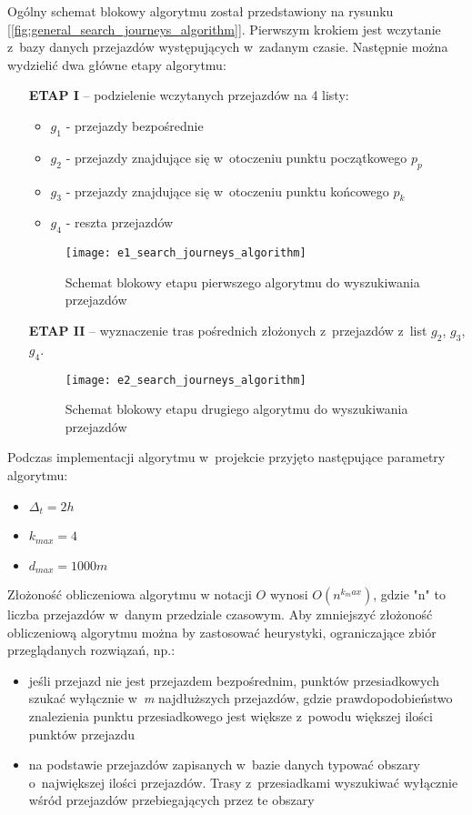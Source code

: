 \documentclass[eng,archivemode]{mgr}
\begin{document}
Ogólny schemat blokowy algorytmu został przedstawiony na rysunku [\ref{fig:general_search_journeys_algorithm}]. Pierwszym krokiem jest wczytanie z~bazy danych przejazdów występujących w~zadanym czasie. Następnie można wydzielić dwa główne etapy algorytmu:
\newpage
\begin{enumerate}
	\item[\textbf{ETAP I}] -- podzielenie wczytanych przejazdów na 4 listy:
	\begin{itemize}
		\item $g_1$ - przejazdy bezpośrednie
		\item $g_2$ - przejazdy znajdujące się w~otoczeniu punktu początkowego $p_{p}$
		\item $g_3$ - przejazdy znajdujące się w~otoczeniu punktu końcowego $p_{k}$
		\item $g_4$ - reszta przejazdów
	\end{itemize}
	\begin{figure}[H]
		\centering
		\texttt{[image: e1\_search\_journeys\_algorithm]}
		\caption{Schemat blokowy etapu pierwszego algorytmu do wyszukiwania przejazdów}
		\label{fig:e1_search_journeys_algorithm}
	\end{figure}
	\newpage
	\item[\textbf{ETAP II}] -- wyznaczenie tras pośrednich złożonych z~przejazdów z~list $g_2$, $g_3$, $g_4$.
	\begin{figure}[H]
		\centering
		\texttt{[image: e2\_search\_journeys\_algorithm]}
		\caption{Schemat blokowy etapu drugiego algorytmu do wyszukiwania przejazdów}
		\label{fig:e2_search_journeys_algorithm}
	\end{figure}
\end{enumerate}

Podczas implementacji algorytmu w~projekcie przyjęto następujące parametry algorytmu:
\begin{itemize}
	\item $\Delta_{t}=2h$
	\item $k_{max}=4$
	\item $d_{max}=1000m$
\end{itemize}

 Złożoność obliczeniowa algorytmu w notacji $O$\cite{cormen} wynosi $O(n^{k_max})$, gdzie "n" to liczba przejazdów w~danym przedziale czasowym. Aby zmniejszyć złożoność obliczeniową algorytmu można by zastosować heurystyki, ograniczające zbiór przeglądanych rozwiązań, np.:
\begin{itemize}
	\item jeśli przejazd nie jest przejazdem bezpośrednim, punktów przesiadkowych szukać wyłącznie w~\textit{m} najdłuższych przejazdów, gdzie prawdopodobieństwo znalezienia punktu przesiadkowego jest większe z~powodu większej ilości punktów przejazdu
	\item na podstawie przejazdów zapisanych w~bazie danych typować obszary o~największej ilości przejazdów. Trasy z~przesiadkami wyszukiwać wyłącznie wśród przejazdów przebiegających przez te obszary
\end{itemize}
\end{document}
